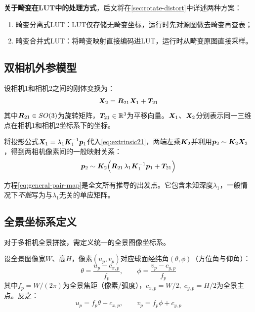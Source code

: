 \medskip
\noindent\textbf{关于畸变在LUT中的处理方式}，后文将在\cref{sec:rotate-distort}中详述两种方案：
\begin{enumerate}[label=(\arabic*)]
  \item 畸变分离式LUT：LUT仅存储无畸变坐标，运行时先对源图做去畸变再查表；
  \item 畸变合并式LUT：将畸变映射直接编码进LUT，运行时从畸变原图直接采样。
\end{enumerate}

\subsection{双相机外参模型}
\label{sec:extrinsic-pair}

\begin{definition}[双相机外参]
设相机1和相机2之间的刚体变换为：
\begin{equation}
\bm{X}_2 = \bm{R}_{21} \bm{X}_1 + \bm{T}_{21}
\label{eq:extrinsic21}
\end{equation}
其中$\bm{R}_{21} \in SO(3)$为旋转矩阵，$\bm{T}_{21} \in \mathbb{R}^3$为平移向量。$\bm{X}_1$、$\bm{X}_2$分别表示同一三维点在相机1和相机2坐标系下的坐标。
\end{definition}

将投影公式$\bm{X}_1 = \lambda_1 \bm{K}_1^{-1} \bm{p}_1$代入\eqref{eq:extrinsic21}，两端左乘$\bm{K}_2$并利用$\bm{p}_2 \sim \bm{K}_2 \bm{X}_2$，得到两相机像素间的一般映射关系：
\begin{equation}
\bm{p}_2 \sim \bm{K}_2\Bigl(\bm{R}_{21}\,\lambda_1 \bm{K}_1^{-1} \bm{p}_1 + \bm{T}_{21}\Bigr)
\label{eq:general-pair-map}
\end{equation}

方程\eqref{eq:general-pair-map}是全文所有推导的出发点。它包含未知深度$\lambda_1$，一般情况下\emph{不能}写为与$\lambda_1$无关的单应矩阵。

\subsection{全景坐标系定义}
\label{sec:pano-coords}

对于多相机全景拼接，需定义统一的全景图像坐标系。

\begin{definition}
设全景图像宽$W$、高$H$，像素$(u_p, v_p)$对应球面经纬角$(\theta, \phi)$（方位角与仰角）：
\begin{equation}
\theta = \frac{u_p - c_{x,p}}{f_p},
\qquad
\phi   = \frac{v_p - c_{y,p}}{f_p}
\label{eq:pano-pixel-to-angle}
\end{equation}
其中$f_p = W / (2\pi)$为全景焦距（像素/弧度），$c_{x,p}=W/2,\;c_{y,p}=H/2$为全景主点。反之：
\begin{equation}
u_p = f_p \theta + c_{x,p},
\qquad
v_p = f_p \phi   + c_{y,p}
\label{eq:angle-to-pano-pixel}
\end{equation}
\end{definition}

